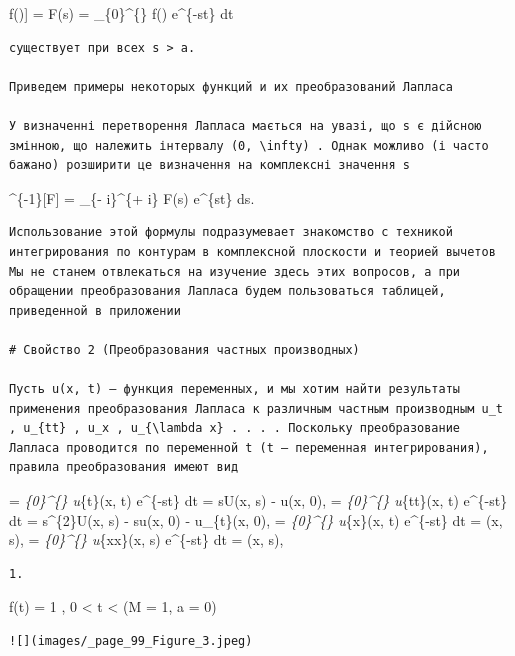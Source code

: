 \documentclass[
  ukrainian,
]{article}
\begin{document}
\mathscr{L}{[}f(\ell){]} = F(s) = \int\_\{0\}\^{}\{\infty\} f(\ell)
e\^{}\{-st\} dt

\begin{verbatim}
существует при всех s > a.

Приведем примеры некоторых функций и их преобразований Лапласа

У визначенні перетворення Лапласа мається на увазі, що s є дійсною змінною, що належить інтервалу (0, \infty) . Однак можливо (і часто бажано) розширити це визначення на комплексні значення s
\end{verbatim}

\^{}\{-1\}{[}F{]} =  \int\_\{\epsilon -
i\infty\}\^{}\{\epsilon + i\infty\} F(s) e\^{}\{st\} ds.

\begin{verbatim}
Использование этой формулы подразумевает знакомство с техникой интегрирования по контурам в комплексной плоскости и теорией вычетов Мы не станем отвлекаться на изучение здесь этих вопросов, а при обращении преобразования Лапласа будем пользоваться таблицей, приведенной в приложении

# Свойство 2 (Преобразования частных производных)

Пусть u(x, t) — функция переменных, и мы хотим найти результаты применения преобразования Лапласа к различным частным производным u_t , u_{tt} , u_x , u_{\lambda x} . . . . Поскольку преобразование Лапласа проводится по переменной t (t — переменная интегрирования), правила преобразования имеют вид
\end{verbatim}

\left[u_{t}\right] = \int\emph{\{0\}\^{}\{\infty\} u}\{t\}(x,
t) e\^{}\{-st\} dt = sU(x, s) - u(x, 0),
\left[u_{tt}\right] = \int\emph{\{0\}\^{}\{\infty\}
u}\{tt\}(x, t) e\^{}\{-st\} dt = s\^{}\{2\}U(x, s) - su(x, 0) -
u\_\{t\}(x, 0), \left[u_{x}\right] =
\int\emph{\{0\}\^{}\{\infty\} u}\{x\}(x, t) e\^{}\{-st\} dt =
(x, s), \left[u_{xx}\right] =
\int\emph{\{0\}\^{}\{\infty\} u}\{xx\}(x, s) e\^{}\{-st\} dt =
(x, s),

\begin{verbatim}
1.
\end{verbatim}

f(t) = 1 , 0 \textless{} t \textless{} \infty    (M = 1, a = 0)

\begin{verbatim}
![](images/_page_99_Figure_3.jpeg)
\end{verbatim}
\end{document}
